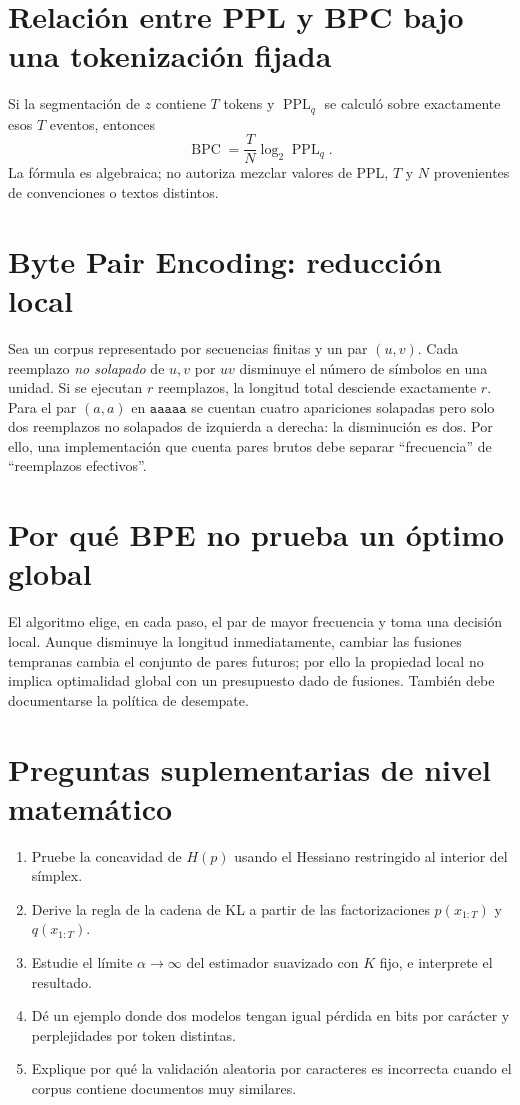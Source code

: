 \section{Relación entre PPL y BPC bajo una tokenización fijada}
Si la segmentación de $z$ contiene $T$ tokens y $\operatorname{PPL}_q$
se calculó sobre exactamente esos $T$ eventos, entonces
\[
\operatorname{BPC}=\frac{T}{N}\log_2\operatorname{PPL}_q.
\]
La fórmula es algebraica; no autoriza mezclar valores de PPL, $T$ y $N$
provenientes de convenciones o textos distintos.
\section{Byte Pair Encoding: reducción local}
Sea un corpus representado por secuencias finitas y un par $(u,v)$.
Cada reemplazo \emph{no solapado} de $u,v$ por $uv$ disminuye
el número de símbolos en una unidad. Si se ejecutan $r$ reemplazos,
la longitud total desciende exactamente $r$. Para el par $(a,a)$ en
$\texttt{aaaaa}$ se cuentan cuatro apariciones solapadas pero solo dos
reemplazos no solapados de izquierda a derecha: la disminución es dos.
Por ello, una implementación que cuenta pares brutos debe separar
``frecuencia'' de ``reemplazos efectivos''.
\section{Por qué BPE no prueba un óptimo global}
El algoritmo elige, en cada paso, el par de mayor frecuencia y toma una
decisión local. Aunque disminuye la longitud inmediatamente, cambiar las
fusiones tempranas cambia el conjunto de pares futuros; por ello la
propiedad local no implica optimalidad global con un presupuesto dado de
fusiones. También debe documentarse la política de desempate.
\section{Preguntas suplementarias de nivel matemático}
\begin{enumerate}
\item Pruebe la concavidad de $H(p)$ usando el Hessiano restringido al
interior del símplex.
\item Derive la regla de la cadena de KL a partir de las factorizaciones
$p(x_{1:T})$ y $q(x_{1:T})$.
\item Estudie el límite $\alpha\to\infty$ del estimador suavizado
con $K$ fijo, e interprete el resultado.
\item Dé un ejemplo donde dos modelos tengan igual pérdida en bits por
carácter y perplejidades por token distintas.
\item Explique por qué la validación aleatoria por caracteres es
incorrecta cuando el corpus contiene documentos muy similares.
\end{enumerate}
\clearpage


